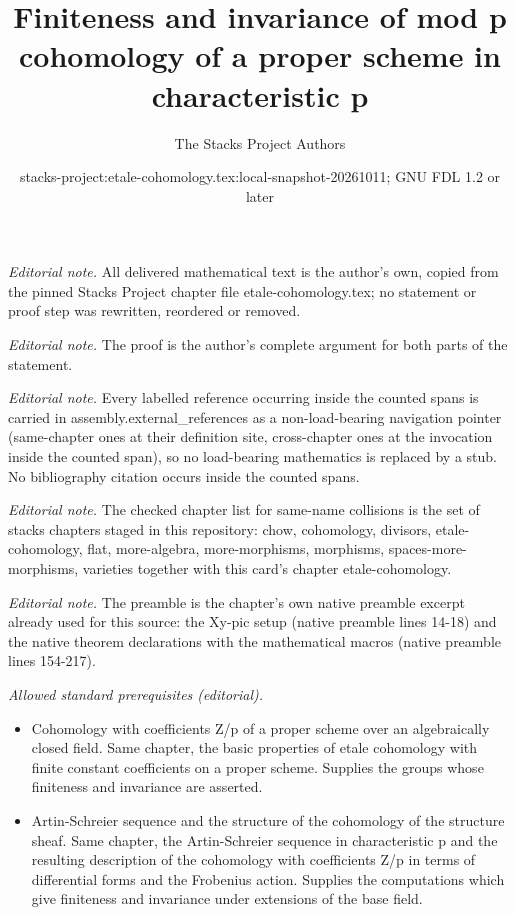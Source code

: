 \documentclass[10pt,a4paper]{amsart}
\title{Finiteness and invariance of mod p cohomology of a proper scheme in characteristic p}
\author{The Stacks Project Authors}
\date{stacks-project:etale-cohomology.tex:local-snapshot-20261011; GNU FDL 1.2 or later}
\theoremstyle{plain}
\theoremstyle{definition}
\theoremstyle{remark}
\numberwithin{equation}{subsection}
\begin{document}
\maketitle
\noindent\textit{Editorial note.} All delivered mathematical text is the author's own, copied from the pinned Stacks Project chapter file etale-cohomology.tex; no statement or proof step was rewritten, reordered or removed.\par\medskip
\noindent\textit{Editorial note.} The proof is the author's complete argument for both parts of the statement.\par\medskip
\noindent\textit{Editorial note.} Every labelled reference occurring inside the counted spans is carried in assembly.external\_references as a non-load-bearing navigation pointer (same-chapter ones at their definition site, cross-chapter ones at the invocation inside the counted span), so no load-bearing mathematics is replaced by a stub. No bibliography citation occurs inside the counted spans.\par\medskip
\noindent\textit{Editorial note.} The checked chapter list for same-name collisions is the set of stacks chapters staged in this repository: chow, cohomology, divisors, etale-cohomology, flat, more-algebra, more-morphisms, morphisms, spaces-more-morphisms, varieties together with this card's chapter etale-cohomology.\par\medskip
\noindent\textit{Editorial note.} The preamble is the chapter's own native preamble excerpt already used for this source: the Xy-pic setup (native preamble lines 14-18) and the native theorem declarations with the mathematical macros (native preamble lines 154-217).\par\medskip
\noindent\textit{Allowed standard prerequisites (editorial).}\begin{itemize}
\item Cohomology with coefficients Z/p of a proper scheme over an algebraically closed field. Same chapter, the basic properties of etale cohomology with finite constant coefficients on a proper scheme. Supplies the groups whose finiteness and invariance are asserted.
\item Artin-Schreier sequence and the structure of the cohomology of the structure sheaf. Same chapter, the Artin-Schreier sequence in characteristic p and the resulting description of the cohomology with coefficients Z/p in terms of differential forms and the Frobenius action. Supplies the computations which give finiteness and invariance under extensions of the base field.
\end{itemize}\medskip
\end{document}
